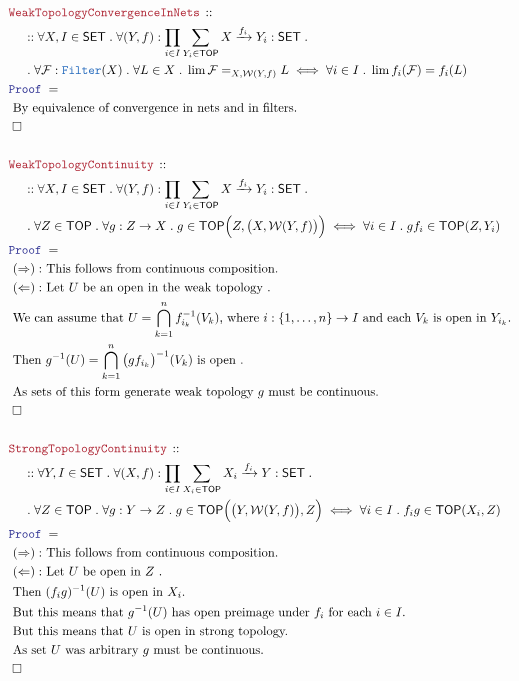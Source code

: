 \documentclass[12pt]{scrartcl}
\newcommand{\TYPE}[1]{\textcolor{NavyBlue}{\mathtt{#1}}}
\newcommand{\LOGIC}[1]{\textcolor{Blue}{\mathtt{#1}}}
\newcommand{\THM}[1]{\textcolor{Maroon}{\mathtt{#1}}}
\renewcommand{\.}{\; . \;}
\newcommand{\Theorem}[2]{& \THM{#1} \, :: \, #2 \\ & \Proof = \\ }
\newcommand{\NewLine}{\\ & \kern 1pc}
\newcommand{\Page}[1]{ \begin{align*} #1 \end{align*}   }
\newcommand{\Explain}[1]{& \text{#1.} \\}
\newcommand{\Arrow}{\xrightarrow}
\newcommand{\QED}{\; \square}
\newcommand{\EndProof}{& \QED \\}
\newcommand{\Proof}{\LOGIC{Proof} \; }
\newcommand{\SET}{\mathsf{SET}}
\newcommand{\Filter}{\TYPE{Filter}}
\newcommand{\TOP}{\mathsf{TOP}}
\newcommand{\F}{\mathcal{F}}
\newcommand{\W}{\mathcal{W}}
\begin{document}
\newpage
\Page{
	\Theorem{WeakTopologyConvergenceInNets}
	{
		\NewLine ::		
		\forall X, I \in \SET \.
		\forall (Y,f) : \prod_{i \in I} \sum_{Y_i \in \TOP }  X \Arrow{f_i} Y_i : \SET \. \NewLine \.
		\forall \F : \Filter(X) \.
		\forall L \in X \.
		\lim \F =_{X,\W(Y,f)} L
		\iff
		\forall i \in I \. \lim f_i(\F) =  f_i(L)	
	}
	\Explain{ 
		By equivalence of convergence in nets and in filters}
	\EndProof
	\\
	\Theorem{WeakTopologyContinuity}
	{
		\NewLine ::
		\forall X,I \in \SET \.
		\forall  (Y,f) : \prod_{i \in I} \sum_{Y_i \in \TOP }  X \Arrow{f_i} Y_i : \SET \. \NewLine \.
		\forall Z \in \TOP \.
		\forall g : Z \to X  \.
		g \in \TOP\Big( Z,\big( X, \W(Y,f) \big) \Big) 
		\iff
		\forall i \in I \. gf_i \in \TOP(Z,Y_i) 
	}
	\Explain{
		$(\Rightarrow):$ This follows from continuous composition}
	\Explain{  
		$(\Leftarrow):$ Let $U$ be an open in the weak topology  
	}
	\Explain{
		We can assume that $U = \bigcap^{n}_{k=1}f_{i_k}^{-1}(V_k)$,
		where $i : \{1,\ldots,n\} \to I$ and each $V_k$ is open in $Y_{i_k}$}
	\Explain{
		Then $g^{-1}(U) = \bigcap^{n}_{k=1} \big(gf_{i_k}\big)^{-1}(V_k)$ is open
	}
	\Explain{
		As sets of this form generate weak topology $g$ must be continuous}
	\EndProof
	\\
	\Theorem{StrongTopologyContinuity}
	{
		\NewLine ::
		\forall Y,I \in \SET \.
		\forall  (X,f) : \prod_{i \in I} \sum_{X_i \in \TOP }  X_i \Arrow{f_i} Y : \SET \. \NewLine \.
		\forall Z \in \TOP \.
		\forall g : Y \to Z  \.
		g \in \TOP\Big(\big( Y, \W(Y,f) \big), Z \Big) 
		\iff
		\forall i \in I \. f_ig \in \TOP(X_i,Z) 
	}
	\Explain{
		$(\Rightarrow):$ This follows from continuous composition}
	\Explain{  
		$(\Leftarrow):$ Let $U$ be open in $Z$  
	}
	\Explain{
		Then $(f_ig)^{-1}(U)$ is open in $X_i$}
	\Explain{
		But this means  that $g^{-1}(U)$ has open preimage under $f_i$ for  each $i \in I$}
	\Explain{
		But this means that $U$ is open in strong topology}
	\Explain{
		As set $U$ was arbitrary $g$ must be continuous}
	\EndProof
}
\newpage
\end{document}
